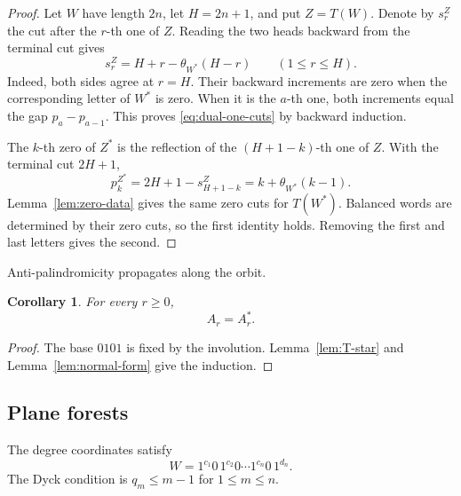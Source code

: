 \documentclass[11pt]{article}
\newtheorem{corollary}[theorem]{Corollary}
\theoremstyle{definition}
\theoremstyle{remark}
\newcommand{\Star}{*}
\begin{document}
\begin{proof}
Let \(W\) have length \(2n\), let \(H=2n+1\), and put \(Z=T(W)\).  Denote by
\(s_r^Z\) the cut after the \(r\)-th one of \(Z\).  Reading the two heads
backward from the terminal cut gives
\begin{equation}
\label{eq:dual-one-cuts}
 s_r^Z=H+r-\theta_{W^{\Star}}(H-r)
 \qquad(1\leq r\leq H).
\end{equation}
Indeed, both sides agree at \(r=H\).  Their backward increments are zero
when the corresponding letter of \(W^{\Star}\) is zero.  When it is the
\(a\)-th one, both increments equal the gap \(p_a-p_{a-1}\).  This proves
\eqref{eq:dual-one-cuts} by backward induction.

The \(k\)-th zero of \(Z^{\Star}\) is the reflection of the
\((H+1-k)\)-th one of \(Z\).  With the terminal cut \(2H+1\),
\[
 p_k^{Z^{\Star}}
 =2H+1-s_{H+1-k}^Z
 =k+\theta_{W^{\Star}}(k-1).
\]
Lemma~\ref{lem:zero-data} gives the same zero cuts for \(T(W^{\Star})\).
Balanced words are determined by their zero cuts, so the first identity
holds.  Removing the first and last letters gives the second.
\end{proof}

Anti-palindromicity propagates along the orbit.
\begin{corollary}
\label{cor:orbital-anti}
For every \(r\geq0\),
\[
 A_r=A_r^{\Star}.
\]
\end{corollary}

\begin{proof}
The base \(0101\) is fixed by the involution.  Lemma~\ref{lem:T-star} and
Lemma~\ref{lem:normal-form} give the induction.
\end{proof}

\subsection{Plane forests}

The degree coordinates satisfy
\begin{equation}
\label{eq:degree-expansion}
 W=1^{c_1}0\,1^{c_2}0\cdots1^{c_n}0\,1^{d_n}.
\end{equation}
The Dyck condition is \(q_m\leq m-1\) for \(1\leq m\leq n\).
\end{document}
